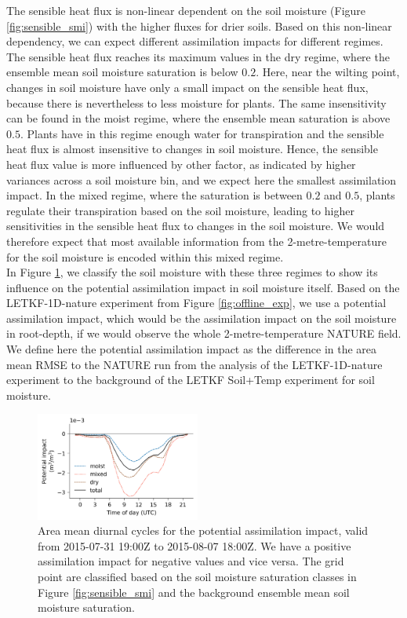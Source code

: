 \documentclass[hess, manuscript]{copernicus}
\begin{document}
The sensible heat flux is non-linear dependent on the soil moisture (Figure \ref{fig:sensible_smi}) with the higher fluxes for drier soils.
Based on this non-linear dependency, we can expect different assimilation impacts for different regimes.
The sensible heat flux reaches its maximum values in the dry regime, where the ensemble mean soil moisture saturation is below $0.2$.
Here, near the wilting point, changes in soil moisture have only a small impact on the sensible heat flux, because there is nevertheless to less moisture for plants.
The same insensitivity can be found in the moist regime, where the ensemble mean saturation is above $0.5$.
Plants have in this regime enough water for transpiration and the sensible heat flux is almost insensitive to changes in soil moisture.
Hence, the sensible heat flux value is more influenced by other factor, as indicated by higher variances across a soil moisture bin, and we expect here the smallest assimilation impact.
In the mixed regime, where the saturation is between $0.2$ and $0.5$, plants regulate  their transpiration based on the soil moisture, leading to higher sensitivities in the sensible heat flux to changes in the soil moisture.
We would therefore expect that most available information from the 2-metre-temperature for the soil moisture is encoded within this mixed regime.\\

In Figure \ref{fig:h_impact}, we classify the soil moisture with these three regimes to show its influence on the potential assimilation impact in soil moisture itself.
Based on the LETKF-1D-nature experiment from Figure \ref{fig:offline_exp}, we use a potential assimilation impact, which would be the assimilation impact on the soil moisture in root-depth, if we would observe the whole 2-metre-temperature NATURE field.
We define here the potential assimilation impact as the difference in the area mean RMSE  to the NATURE run from the analysis of the LETKF-1D-nature experiment to the background of the LETKF Soil+Temp experiment for soil moisture.

\begin{figure}[ht]
	\includegraphics[width=0.48\textwidth]{figures/fig_09_soil_moisture_impact.png}
	\caption{
		Area mean diurnal cycles for the potential assimilation impact, valid from 2015-07-31 19:00Z to 2015-08-07 18:00Z.
		We have a positive assimilation impact for negative values and vice versa.
		The grid point are classified based on the soil moisture saturation classes in Figure \ref{fig:sensible_smi} and the background ensemble mean soil moisture saturation.
	}
	\label{fig:h_impact}
\end{figure}
\end{document}
